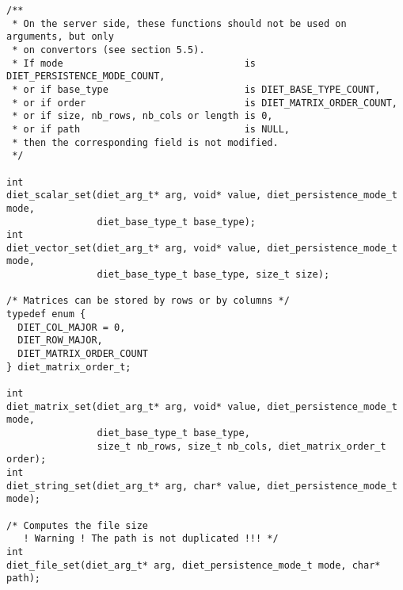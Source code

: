 \label{sec:setfun}
{\footnotesize
\begin{verbatim}
/**
 * On the server side, these functions should not be used on arguments, but only
 * on convertors (see section 5.5).
 * If mode                                is DIET_PERSISTENCE_MODE_COUNT, 
 * or if base_type                        is DIET_BASE_TYPE_COUNT,
 * or if order                            is DIET_MATRIX_ORDER_COUNT,
 * or if size, nb_rows, nb_cols or length is 0,
 * or if path                             is NULL,
 * then the corresponding field is not modified.
 */

int
diet_scalar_set(diet_arg_t* arg, void* value, diet_persistence_mode_t mode,
                diet_base_type_t base_type);
int
diet_vector_set(diet_arg_t* arg, void* value, diet_persistence_mode_t mode,
                diet_base_type_t base_type, size_t size);

/* Matrices can be stored by rows or by columns */
typedef enum {
  DIET_COL_MAJOR = 0,
  DIET_ROW_MAJOR,
  DIET_MATRIX_ORDER_COUNT
} diet_matrix_order_t;

int
diet_matrix_set(diet_arg_t* arg, void* value, diet_persistence_mode_t mode,
                diet_base_type_t base_type,
                size_t nb_rows, size_t nb_cols, diet_matrix_order_t order);
int
diet_string_set(diet_arg_t* arg, char* value, diet_persistence_mode_t mode);

/* Computes the file size
   ! Warning ! The path is not duplicated !!! */
int
diet_file_set(diet_arg_t* arg, diet_persistence_mode_t mode, char* path);
\end{verbatim}
}


